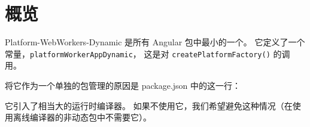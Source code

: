 \section{概览}


Platform-WebWorkers-Dynamic 是所有 Angular 包中最小的一个。
它定义了一个常量，\texttt{platformWorkerAppDynamic}，
这是对 \texttt{createPlatformFactory()} 的调用。


将它作为一个单独的包管理的原因是 package.json 中的这一行：




它引入了相当大的运行时编译器。
如果不使用它，我们希望避免这种情况（在使用离线编译器的非动态包中不需要它）。
